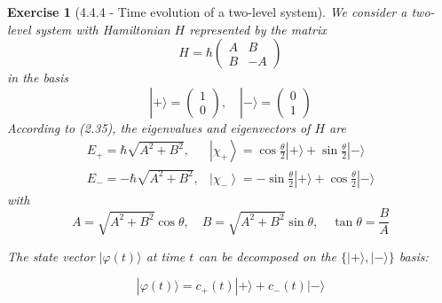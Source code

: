 \documentclass[12pt]{article}
\newtheorem{exercise}{Exercise}
\begin{document}
	\begin{exercise}[4.4.4 - Time evolution of a two-level system]
		We consider a two-level system with Hamiltonian $H$ represented by the matrix
		$$
		H=\hbar\left(\begin{array}{cc}
			A & B \\
			B & -A
		\end{array}\right)
		$$
		in the basis
		$$
		|+\rangle=\left(\begin{array}{l}
			1 \\
			0
		\end{array}\right), \quad|-\rangle=\left(\begin{array}{l}
			0 \\
			1
		\end{array}\right)
		$$
		According to (2.35), the eigenvalues and eigenvectors of $H$ are
		$$
		\begin{array}{ll}
			E_{+}=\hbar \sqrt{A^{2}+B^{2}}, & \left|\chi_{+}\right\rangle=\cos \frac{\theta}{2}|+\rangle+\sin \frac{\theta}{2}|-\rangle \\
			E_{-}=-\hbar \sqrt{A^{2}+B^{2}}, & \left|\chi_{-}\right\rangle=-\sin \frac{\theta}{2}|+\rangle+\cos \frac{\theta}{2}|-\rangle
		\end{array}
		$$
		with
		$$
		A=\sqrt{A^{2}+B^{2}} \cos \theta, \quad B=\sqrt{A^{2}+B^{2}} \sin \theta, \quad \tan \theta=\frac{B}{A}
		$$
		\begin{exercises}
		\item The state vector $|\varphi(t)\rangle$ at time $t$ can be decomposed on the $\{|+\rangle,|-\rangle\}$ basis:
		
		$$
		|\varphi(t)\rangle=c_{+}(t)|+\rangle+c_{-}(t)|-\rangle
		$$
		

\end{exercises}
\end{exercise}
\end{document}
